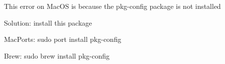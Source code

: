\begin{DoxyItemize}
\item This error on Mac\+OS is because the {\ttfamily pkg-\/config} package is not installed
\item Solution\+: install this package
\begin{DoxyItemize}
\item Mac\+Ports\+: {\ttfamily sudo port install pkg-\/config}
\item Brew\+: {\ttfamily sudo brew install pkg-\/config} 
\end{DoxyItemize}
\end{DoxyItemize}